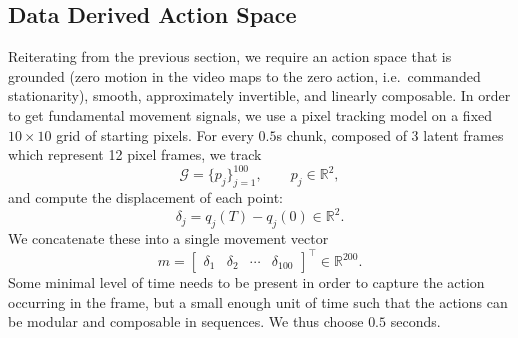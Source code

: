 \documentclass[letterpaper]{article} %
\begin{document}
\subsection{Data Derived Action Space}
\label{sec:pca}

Reiterating from the previous section, we require an action space that is grounded (zero motion in the video maps to the zero action, i.e.\ commanded stationarity), smooth, approximately invertible, and linearly composable. In order to get fundamental movement signals, we use a pixel tracking model \cite{cotracker} on a fixed $10\times10$ grid of starting pixels. For every $0.5$s chunk, composed of 3 latent frames which represent 12 pixel frames, we track
\begin{equation}
    \mathcal{G}=\{p_j\}_{j=1}^{100},
    \qquad
    p_j\in\mathbb{R}^2,
\end{equation}
and compute the displacement of each point:
\begin{equation}
    \delta_j = q_j(T)-q_j(0)\in\mathbb{R}^2.
\end{equation}
We concatenate these into a single movement vector
\begin{equation}
    m =
    \begin{bmatrix}
        \delta_1 & \delta_2 & \cdots & \delta_{100}
    \end{bmatrix}^{\top}
    \in \mathbb{R}^{200}.
    \label{eq:movement_vector}
\end{equation}
Some minimal level of time needs to be present in order to capture the action occurring in the frame, but a small enough unit of time such that the actions can be modular and composable in sequences. We thus choose $0.5$ seconds.
\end{document}
